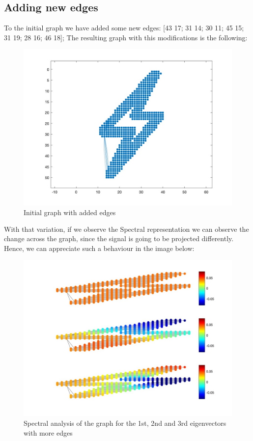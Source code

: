 \documentclass[12pt]{article}
\begin{document}
\subsection{Adding new edges}
To the initial graph we have added some new edges: [43 17; 31 14; 30 11; 45 15; 31 19; 28 16; 46 18]; 
The resulting graph with this modifications is the following:
\begin{figure}[H]
	\centering
	\includegraphics[width=12cm]{graph_more_edges.jpg}
	\caption{Initial graph with added edges}
	\label{fig:MoreEdgesGraph}
\end{figure}
With that variation, if we observe the Spectral representation we can observe the change across the graph, since the signal is going to be projected differently. Hence, we can appreciate such a behaviour in the image below:
\begin{figure}[H]
	\centering
	\includegraphics[width=12cm]{more_edges.jpg}
	\caption{Spectral analysis of the graph for the 1st, 2nd and 3rd eigenvectors with more edges}
	\label{fig:MoreEdgesSpectralRepresentation}
\end{figure}
\end{document}
